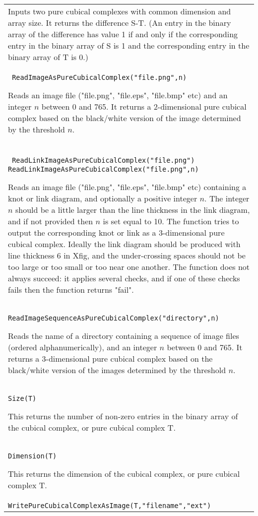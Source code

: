 \documentclass[a4paper,11pt]{report}
\begin{document}
{\begin{center}
\begin{tabular}{|l|}
 Inputs two pure cubical complexes with common dimension and array size. It
returns the difference S-T. (An entry in the binary array of the difference
has value 1 if and only if the corresponding entry in the binary array of S is
1 and the corresponding entry in the binary array of T is 0.) \\
 \index{ReadImageAsPureCubicalComplex} \texttt{ ReadImageAsPureCubicalComplex("file.png",n)} 

 Reads an image file ("file.png", "file.eps", "file.bmp" etc) and an integer $n$ between 0 and 765. It returns a 2-dimensional pure cubical complex based on
the black/white version of the image determined by the threshold $n$. \\
 \index{ReadLinkImageAsPureCubicalComplex} \texttt{ ReadLinkImageAsPureCubicalComplex("file.png")} \texttt{ ReadLinkImageAsPureCubicalComplex("file.png",n)} 

 Reads an image file ("file.png", "file.eps", "file.bmp" etc) containing a knot
or link diagram, and optionally a positive integer $n$. The integer $n$ should be a little larger than the line thickness in the link diagram, and if
not provided then $n$ is set equal to 10. The function tries to output the corresponding knot or
link as a 3-dimensional pure cubical complex. Ideally the link diagram should
be produced with line thickness 6 in Xfig, and the under-crossing spaces
should not be too large or too small or too near one another. The function
does not always succeed: it applies several checks, and if one of these checks
fails then the function returns "fail". \\
 \index{ReadImageSequenceAsPureCubicalComplex} \texttt{ReadImageSequenceAsPureCubicalComplex("directory",n)} 

 Reads the name of a directory containing a sequence of image files (ordered
alphanumerically), and an integer $n$ between 0 and 765. It returns a 3-dimensional pure cubical complex based on
the black/white version of the images determined by the threshold $n$. \\
 \texttt{Size(T)} 

 This returns the number of non-zero entries in the binary array of the cubical
complex, or pure cubical complex T. \\
 \texttt{Dimension(T)} 

 This returns the dimension of the cubical complex, or pure cubical complex T. \\
 \index{WritePureCubicalComplexAsImage} \texttt{WritePureCubicalComplexAsImage(T,"filename","ext")} 


\end{tabular}
\end{center}}
\end{document}
